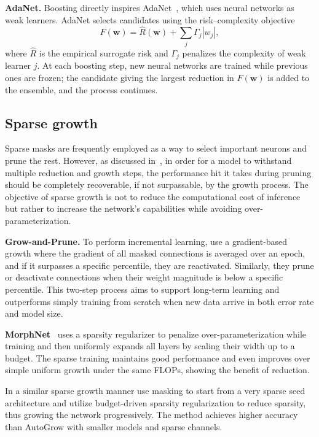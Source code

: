 \textbf{AdaNet.} Boosting directly inspires AdaNet~\citep{cortesAdaNetAdaptiveStructural2017}, which uses neural networks as weak learners. AdaNet selects candidates using the risk--complexity objective
\begin{equation}\label{eq:adanet_main}
F(\mathbf{w}) = \widehat R(\mathbf{w}) + \sum_j \Gamma_j |w_j|,
\end{equation}
where \(\widehat R\) is the empirical surrogate risk and \(\Gamma_j\) penalizes the complexity of weak learner \(j\). At each boosting step, new neural networks are trained while previous ones are frozen; the candidate giving the largest reduction in \(F(\mathbf w)\) is added to the ensemble, and the process continues.

\subsection{Sparse growth}\label{sec:sparse_prune_methods}

Sparse masks are frequently employed as a way to select important neurons and prune the rest. However, as discussed in~\citet{dai_incremental_learning_2022}, in order for a model to withstand multiple reduction and growth steps, the performance hit it takes during pruning should be completely recoverable, if not surpassable, by the growth process. The objective of sparse growth is not to reduce the computational cost of inference but rather to increase the network's capabilities while avoiding over-parameterization.

\textbf{Grow-and-Prune.} To perform incremental learning, \citeauthor{dai_incremental_learning_2022} use a gradient-based growth where the gradient of all masked connections is averaged over an epoch, and if it surpasses a specific percentile, they are reactivated. Similarly, they prune or deactivate connections when their weight magnitude is below a specific percentile. This two-step process aims to support long-term learning and outperforms simply training from scratch when new data arrive in both error rate and model size.

\textbf{MorphNet}~\citep{gordon_morphnet_2018} uses a sparsity regularizer to penalize over-parameterization while training and then uniformly expands all layers by scaling their width up to a budget. The sparse training maintains good performance and even improves over simple uniform growth under the same FLOPs, showing the benefit of reduction.

In a similar sparse growth manner \citet{yuan_growing_2021} use masking to start from a very sparse seed architecture and utilize budget-driven sparsity regularization to reduce sparsity, thus growing the network progressively. The method achieves higher accuracy than AutoGrow with smaller models and sparse channels.

